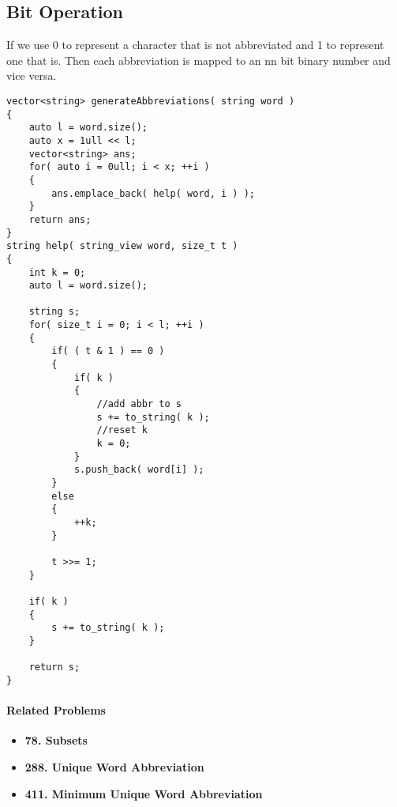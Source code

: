 \subsection{Bit Operation}
If we use 0 to represent a character that is not abbreviated and 1 to represent one that is. Then each abbreviation is mapped to an nn bit binary number and vice versa.

\begin{lstlisting}[style=customc, caption={Bit}]
vector<string> generateAbbreviations( string word )
{
    auto l = word.size();
    auto x = 1ull << l;
    vector<string> ans;
    for( auto i = 0ull; i < x; ++i )
    {
        ans.emplace_back( help( word, i ) );
    }
    return ans;
}
string help( string_view word, size_t t )
{
    int k = 0;
    auto l = word.size();

    string s;
    for( size_t i = 0; i < l; ++i )
    {
        if( ( t & 1 ) == 0 )
        {
            if( k )
            {
                //add abbr to s
                s += to_string( k );
                //reset k
                k = 0;
            }
            s.push_back( word[i] );
        }
        else
        {
            ++k;
        }

        t >>= 1;
    }

    if( k )
    {
        s += to_string( k );
    }

    return s;
}
\end{lstlisting}

\paragraph{Related Problems}
\begin{itemize}
\item \textbf{78. Subsets}
\item \textbf{288. Unique Word Abbreviation}
\item \textbf{411. Minimum Unique Word Abbreviation}
\end{itemize}